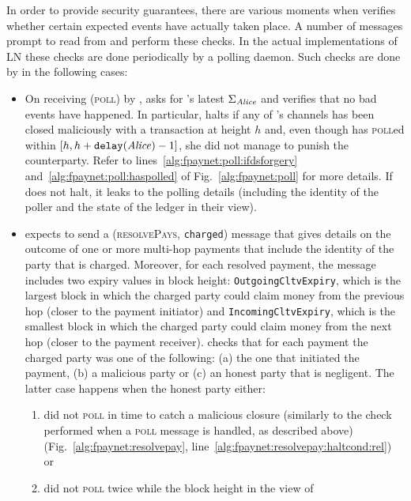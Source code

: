   In order to provide security guarantees, there are various moments when
  \fpaynet{} verifies whether certain expected events have actually taken place.
  A number of messages prompt \fpaynet{} to read from \ledger{} and perform
  these checks. In the actual implementations of LN these checks are done
  periodically by a polling daemon. Such checks are done by \fpaynet{} in the
  following cases:
  \begin{itemize}
    \item On receiving (\textsc{poll}) by \alice, \fpaynet{} asks \ledger{} for
    \alice's latest $\Sigma_{\mathit{Alice}}$ and verifies that no bad events have
    happened. In particular, \fpaynet{} halts if any of \alice's channels has
    been closed maliciously with a transaction at height $h$ and, even though
    \alice{} has \textsc{poll}ed within $[h, h + \mathtt{delay}(\mathit{Alice}) - 1]$,
    she did not manage to punish the counterparty. Refer to
    lines~\ref{alg:fpaynet:poll:ifdsforgery}
    and~\ref{alg:fpaynet:poll:haspolled} of Fig.~\ref{alg:fpaynet:poll} for more
    details. If \fpaynet{} does not halt, it leaks to \simulator{} the polling
    details (including the identity of the poller and the state of the ledger in
    their view).
    \item \fpaynet{} expects \simulator{} to send a (\textsc{resolvePays},
    \texttt{charged}) message that gives details on the outcome of one or more
    multi-hop payments that include the identity of the party that is charged.
    Moreover, for each resolved payment, the message includes two expiry values
    in block height: \texttt{OutgoingCltvExpiry}, which is the largest block in
    which the charged party could claim money from the previous hop (closer to
    the payment initiator) and \texttt{IncomingCltvExpiry}, which is the
    smallest block in which the charged party could claim money from the next
    hop (closer to the payment receiver). \fpaynet{} checks that for each
    payment the charged party was one of the following: (a) the one that
    initiated the payment, (b) a malicious party or (c) an honest party that is
    negligent. The latter case happens when the honest party either:
    \begin{enumerate}
      \item did not \textsc{poll} in time to catch a malicious closure
      (similarly to the check performed when a \textsc{poll} message is handled,
      as described above) (Fig.~\ref{alg:fpaynet:resolvepay},
      line~\ref{alg:fpaynet:resolvepay:haltcond:rel}) or
      \item did not \textsc{poll} twice while the block height in the view of

\end{enumerate}
\end{itemize}
